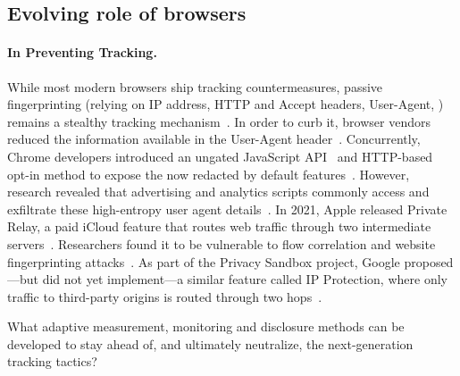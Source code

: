 \subsection{Evolving role of browsers}

\paragraph{In Preventing Tracking.}
While most modern browsers ship tracking countermeasures, passive fingerprinting (relying on IP address, HTTP and Accept headers, User-Agent, \etc{}) remains a stealthy tracking mechanism~\cite{mayerThirdPartyWebTracking2012,dotyMitigatingBrowserFingerprinting2019,fraihiClientsideServersideTracking2024}.
In order to curb it, browser vendors reduced the information available in the User-Agent header~\cite{davisReleaseNotesSafari2017,kimura1609304ReduceGeckos2020,googleWhatUserAgentReduction2024}.
%
Concurrently, Chrome developers introduced an ungated JavaScript API~\cite{mdnUserAgentClientHints2024,taylorUserAgentClientHints2024a} and HTTP-based opt-in method to expose the now redacted by default features~\cite{mdnHTTPClientHints2024}. However, research revealed that advertising and analytics scripts commonly access and exfiltrate these high-entropy user agent details~\cite{intumwayaseUARadarExploringImpact2023,senolUnveilingImpactUserAgent2023}.
In 2021, Apple released Private Relay, a paid iCloud feature that routes web traffic through two intermediate servers~\cite{appleICloudPrivateRelay2021}. Researchers found it to be vulnerable to flow correlation and website fingerprinting attacks~\cite{zohaibInvestigatingTrafficAnalysis2023}.
%
As part of the Privacy Sandbox project, Google proposed---but did not yet implement---a similar feature called IP Protection, where only traffic to third-party origins is routed through two hops~\cite{googleIPProtectionPrivacy2024}.


\begin{opbox}
What adaptive measurement, monitoring and disclosure methods can be developed to stay ahead of, and ultimately neutralize, the next-generation tracking tactics?
\end{opbox}


